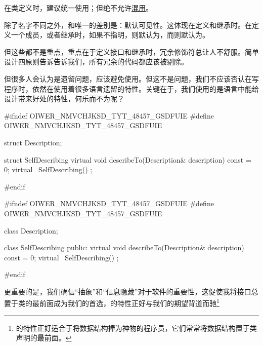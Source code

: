 \begin{content}

\begin{advise}
在类定义时，建议统一使用；但绝不允许\underline{混用}。
\end{advise}

除了名字不同之外，和唯一的差别是：默认可见性。这体现在定义和继承时。在定义一个成员，或者继承时，如果不指明，则默认为，而则默认为。

但这些都不是重点，重点在于定义接口和继承时，冗余修饰符总让人不舒服。简单设计四原则告诉告诉我们，所有冗余的代码都应该被剔除。

但很多人会认为是\clang{}遗留问题，应该避免使用。但这不是问题，我们不应该否认在写\cpp{}程序时，依然在使用着很多\clang{}语言遗留的特性。关键在于，我们使用的是\clang{}语言中能给设计带来好处的特性，何乐而不为呢？

\begin{leftbar}
\begin{c++}[caption={hamcrest/SelfDescribing.h}]
#ifndef OIWER_NMVCHJKSD_TYT_48457_GSDFUIE
#define OIWER_NMVCHJKSD_TYT_48457_GSDFUIE

struct Description;

struct SelfDescribing
{
    virtual void describeTo(Description& description) const = 0;
    virtual ~SelfDescribing() {}
};

#endif
\end{c++}
\end{leftbar}

\begin{leftbar}
\begin{c++}[caption={hamcrest/SelfDescribing.h}]
#ifndef OIWER_NMVCHJKSD_TYT_48457_GSDFUIE
#define OIWER_NMVCHJKSD_TYT_48457_GSDFUIE

class Description;

class SelfDescribing
{
public:
    virtual void describeTo(Description& description) const = 0;
    virtual ~SelfDescribing() {}
};

#endif
\end{c++}
\end{leftbar}

更重要的是，我们确信“抽象”和“信息隐藏”对于软件的重要性，这促使我将接口总置于类的最前面成为我们的首选，的特性正好与我们的期望背道而驰\footnote{的特性正好适合于将数据结构捧为神物的程序员，它们常常将数据结构置于类声明的最前面。}


\end{content}
